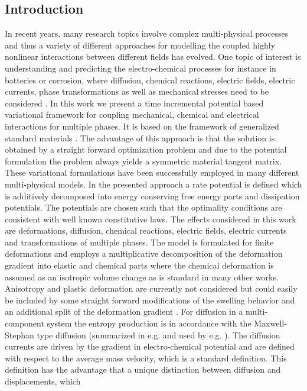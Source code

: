 \subsection{Introduction}
In recent years, many research topics involve complex multi-physical processes and thus a variety of different approaches for modelling the coupled highly nonlinear interactions between different fields has evolved. One topic of interest is understanding and predicting the electro-chemical processes for instance in batteries or corrosion, where diffusion, chemical reactions, electric fields, electric currents, phase transformations as well as mechanical stresses need to be considered \supercite{grazioli_review_2016,zhao_review_2019,abdalla_review_2020,brosa_planella_review_2022}. In this work we present a time incremental potential based variational framework for coupling mechanical, chemical and electrical interactions for multiple phases. It is based on the framework of generalized standard materials \supercite{halphen_sur_1975,miehe_multi-field_2011}. The advantage of this approach is that the solution is obtained by a straight forward optimization problem and due to the potential formulation the problem always yields a symmetric material tangent matrix. These variational formulations have been successfully employed in many different multi-physical models\supercite{garcia_thermodynamically_2004,bargmann_incremental_2008,stainier_study_2010,miehe_variational_2011,mielke_formulation_2011,bartels_thermomechanical_2015}. In the presented approach a rate potential is defined which is additively decomposed into energy conserving free energy parts and dissipation potentials. The potentials are chosen such that the optimality conditions are consistent with well known constitutive laws. The effects considered in this work are deformations, diffusion, chemical reactions, electric fields, electric currents and transformations of multiple phases. The model is formulated for finite deformations and employs a multiplicative decomposition of the deformation gradient into elastic and chemical parts where the chemical deformation is assumed as an isotropic volume change as is standard in many other works\supercite{bower_simple_2012,dal_computational_2015,weinberg_chemo-mechanical_2018,bistri_modeling_2021,hu_three-dimensional_2023}. Anisotropy and plastic deformation are  currently not considered but could easily be included by some straight forward modifications of the swelling behavior and an additional split of the deformation gradient \supercite{bower_simple_2012,zhang_electro-chemo-thermo-mechanical_2020,shanthraj_multi-component_2020,bistri_modeling_2021}. For diffusion in a multi-component system the entropy production is in accordance with the Maxwell-Stephan type diffusion (summarized in e.g.  and used by e.g. ). The diffusion currents are driven by the gradient in electro-chemical potential and are defined with respect to the average mass velocity, which is a standard definition\supercite{curtiss_multicomponent_1999,svendsen_finite-deformation_2018}. This definition has the advantage that a unique distinction between diffusion and displacements, which 